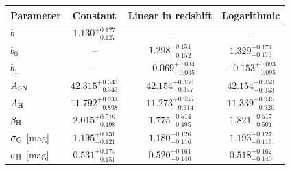 \begin{tabular}{lccc}
\toprule
Parameter & Constant & Linear in redshift & Logarithmic \\
\midrule
$b$ & $1.130^{+0.127}_{-0.127}$ & -- & -- \\
$b_0$ & -- & $1.298^{+0.151}_{-0.152}$ & $1.329^{+0.174}_{-0.173}$ \\
$b_1$ & -- & $-0.069^{+0.034}_{-0.035}$ & $-0.153^{+0.093}_{-0.095}$ \\
$A_{\rm SN}$ & $42.315^{+0.343}_{-0.343}$ & $42.154^{+0.350}_{-0.347}$ & $42.154^{+0.353}_{-0.353}$ \\
$A_{\rm H}$ & $11.792^{+0.934}_{-0.898}$ & $11.273^{+0.935}_{-0.914}$ & $11.339^{+0.945}_{-0.920}$ \\
$\beta_{\rm H}$ & $2.015^{+0.518}_{-0.498}$ & $1.775^{+0.514}_{-0.495}$ & $1.821^{+0.517}_{-0.501}$ \\
$\sigma_{\rm G}$ [mag] & $1.195^{+0.131}_{-0.121}$ & $1.180^{+0.126}_{-0.116}$ & $1.193^{+0.127}_{-0.116}$ \\
$\sigma_{\rm H}$ [mag] & $0.531^{+0.174}_{-0.151}$ & $0.520^{+0.161}_{-0.140}$ & $0.518^{+0.162}_{-0.140}$ \\
\bottomrule
\end{tabular}
